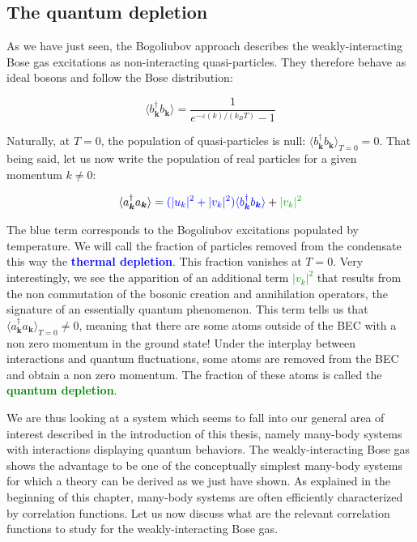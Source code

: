 \subsection{The quantum depletion}

As we have just seen, the Bogoliubov approach describes the weakly-interacting Bose gas excitations as non-interacting quasi-particles. They therefore behave as ideal bosons and follow the Bose distribution:

\begin{equation}
    \langle b^{\dagger}_{\bm{k}}  b_{\bm{k}} \rangle=\frac{1}{e^{-\varepsilon(k)/(k_B T)}-1} 
\end{equation}

Naturally, at $T=0$, the population of quasi-particles is null: $\langle b^{\dagger}_{\bm{k}}  b_{\bm{k}} \rangle_{T=0}=0$. That being said, let us now write the population of real particles for a given momentum $k \neq 0$:

\begin{equation}
    \langle a^{\dagger}_{\bm{k}}  a_{\bm{k}} \rangle=\textcolor{blue}{(|u_k|^2+|v_k|^2)\langle b^{\dagger}_{\bm{k}}  b_{\bm{k}} \rangle} + \textcolor{green}{|v_k|^2}
\end{equation}

The blue term corresponds to the Bogoliubov excitations populated by temperature. We will call the fraction of particles removed from the condensate this way the \textcolor{blue}{\textbf{thermal depletion}}. This fraction vanishes at $T=0$. Very interestingly, we see the apparition of an additional term \textcolor{green}{$|v_k|^2$} that results from the non commutation of the bosonic creation and annihilation operators, the signature of an essentially quantum phenomenon. This term tells us that $\langle a^{\dagger}_{\bm{k}}  a_{\bm{k}} \rangle_{T=0} \neq 0$, meaning that there are some atoms outside of the BEC with a non zero momentum in the ground state! Under the interplay between interactions and quantum fluctuations, some atoms are removed from the BEC and obtain a non zero momentum. The fraction of these atoms is called the \textcolor{green}{\textbf{quantum depletion}}. 

We are thus looking at a system which seems to fall into our general area of interest described in the introduction of this thesis, namely many-body systems with interactions displaying quantum behaviors. The weakly-interacting Bose gas shows the advantage to be one of the conceptually simplest many-body systems for which a theory can be derived as we just have shown. As explained in the beginning of this chapter, many-body systems are often efficiently characterized by correlation functions. Let us now discuss what are the relevant correlation functions to study for the weakly-interacting Bose gas.

